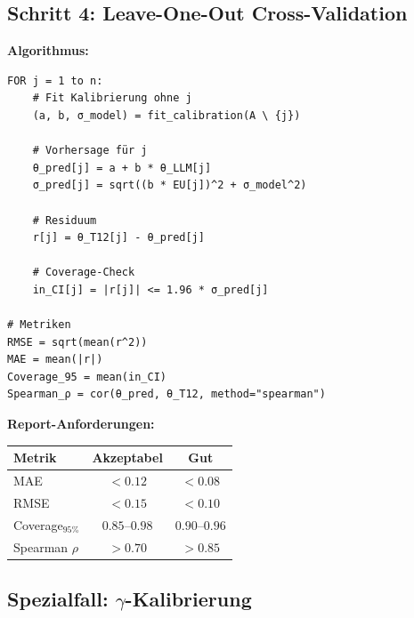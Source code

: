 \subsection{Schritt 4: Leave-One-Out Cross-Validation}

\begin{tcolorbox}[colback=gray!5!white, colframe=gray!75!black,
    title=\textbf{Protokoll HHH-CAL-1: LOO-Validierung}]

\textbf{Algorithmus:}
\begin{verbatim}
FOR j = 1 to n:
    # Fit Kalibrierung ohne j
    (a, b, σ_model) = fit_calibration(A \ {j})

    # Vorhersage für j
    θ_pred[j] = a + b * θ_LLM[j]
    σ_pred[j] = sqrt((b * EU[j])^2 + σ_model^2)

    # Residuum
    r[j] = θ_T12[j] - θ_pred[j]

    # Coverage-Check
    in_CI[j] = |r[j]| <= 1.96 * σ_pred[j]

# Metriken
RMSE = sqrt(mean(r^2))
MAE = mean(|r|)
Coverage_95 = mean(in_CI)
Spearman_ρ = cor(θ_pred, θ_T12, method="spearman")
\end{verbatim}

\textbf{Report-Anforderungen:}
\begin{center}
\renewcommand{\arraystretch}{1.2}
\begin{tabular}{@{}lcc@{}}
\toprule
\textbf{Metrik} & \textbf{Akzeptabel} & \textbf{Gut} \\
\midrule
MAE & $< 0.12$ & $< 0.08$ \\
RMSE & $< 0.15$ & $< 0.10$ \\
Coverage$_{95\%}$ & $0.85$--$0.98$ & $0.90$--$0.96$ \\
Spearman $\rho$ & $> 0.70$ & $> 0.85$ \\
\bottomrule
\end{tabular}
\end{center}

\end{tcolorbox}

\subsection{Spezialfall: $\gamma$-Kalibrierung}


